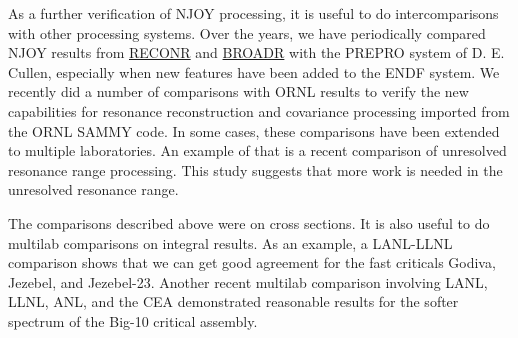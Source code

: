 As a further verification of NJOY processing, it is useful to do
intercomparisons with other processing systems.  Over the years,
we have periodically compared NJOY results from
\hyperlink{sRECONRhy}{RECONR} and \hyperlink{sBROADRhy}{BROADR}
with the PREPRO system of D. E. Cullen\cite{PREPRO}, especially
when new features have been added to the ENDF system.  We recently
did a number of comparisons with ORNL results to verify the new
capabilities for resonance reconstruction and covariance processing
imported from the ORNL SAMMY code.  In some cases, these
comparisons have been extended to multiple laboratories.  An
example of that is a recent comparison of unresolved resonance
range processing\cite{sublet}.  This study suggests that more work
is needed in the unresolved resonance range.

The comparisons described above were on cross sections.  It is also
useful to do multilab comparisons on integral results.  As an example,
a LANL-LLNL comparison\cite{fast} shows that we can get good
agreement for the fast criticals Godiva, Jezebel, and Jezebel-23.
Another recent multilab comparison involving LANL, LLNL, ANL, and
the CEA demonstrated reasonable results for the softer spectrum of
the Big-10 critical assembly\cite{big10}.

\cleardoublepage

